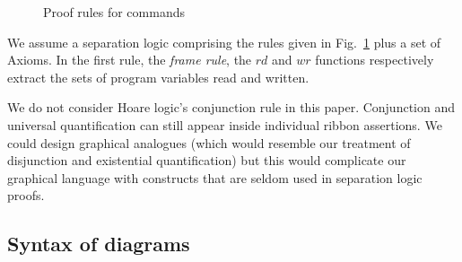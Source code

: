 \documentclass[runningheads,a4paper]{llncs}
\begin{document}
\begin{figure}[t]
\caption{Proof rules for commands}
\label{fig:prov_com}
\end{figure}

\noindent We assume a separation logic comprising the rules given in Fig.~\ref{fig:prov_com} plus a set of {\sf Axioms}. In the first rule, the \emph{frame rule}, the $\mathit{rd}$ and $\mathit{wr}$ functions respectively extract the sets of program variables read and written.

\begin{remark}
We do not consider Hoare logic's conjunction rule in this paper. Conjunction and universal quantification can still appear inside individual ribbon assertions. We could design graphical analogues (which would resemble our treatment of disjunction and existential quantification) but this would complicate our graphical language with constructs that are seldom used in separation logic proofs.
\end{remark}

\subsection{Syntax of diagrams}\label{sect:formalisation_syntax}
\end{document}
